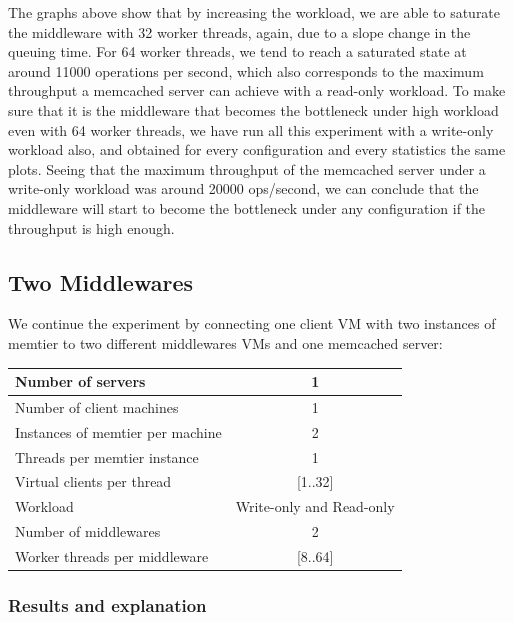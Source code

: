 \documentclass[11pt,a4paper]{article}
\begin{document}
The graphs above show that by increasing the workload, we are able to saturate the middleware with 32 worker threads, again, due to a slope change in the queuing time. For 64 worker threads, we tend to reach a saturated state at around 11000 operations per second, which also corresponds to the maximum throughput a memcached server can achieve with a read-only workload. To make sure that it is the middleware that becomes the bottleneck under high workload even with 64 worker threads, we have run all this experiment with a write-only workload also, and obtained for every configuration and every statistics the same plots. Seeing that the maximum throughput of the memcached server under a write-only workload was around 20000 ops/second, we can conclude that the middleware will start to become the bottleneck under any configuration if the throughput is high enough. 
   
\subsection{Two Middlewares}

We continue the experiment by connecting one client VM with two instances of memtier to two different middlewares VMs and one memcached server:

\begin{center}
	\scriptsize{
		\begin{tabular}{|l|c|}
			\hline Number of servers                & 1                        \\ 
			\hline Number of client machines        & 1                        \\ 
			\hline Instances of memtier per machine & 2                        \\ 
			\hline Threads per memtier instance     & 1                        \\
			\hline Virtual clients per thread       & [1..32]                  \\ 
			\hline Workload                         & Write-only and Read-only \\
			\hline Number of middlewares            & 2                        \\
			\hline Worker threads per middleware    & [8..64]                  \\
			\hline 
		\end{tabular}
	} 
\end{center}
\subsubsection{Results and explanation}
\end{document}

